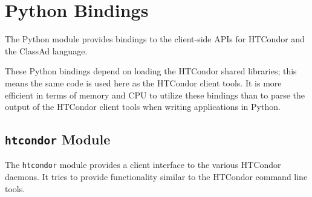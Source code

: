 \section{\label{API-Python} Python Bindings}

The Python module provides bindings to the client-side APIs for HTCondor and
the ClassAd language.

These Python bindings depend on loading the HTCondor shared libraries; this
means the same code is used here as the HTCondor client tools.  It is more
efficient in terms of memory and CPU to utilize these bindings than to parse
the output of the HTCondor client tools when writing applications in Python.

\subsection{\label{Python-OtherModule} \texttt{htcondor}  Module}
The \texttt{htcondor} module provides a client interface to the various 
HTCondor daemons. It tries to provide functionality similar to the HTCondor 
command line tools.

